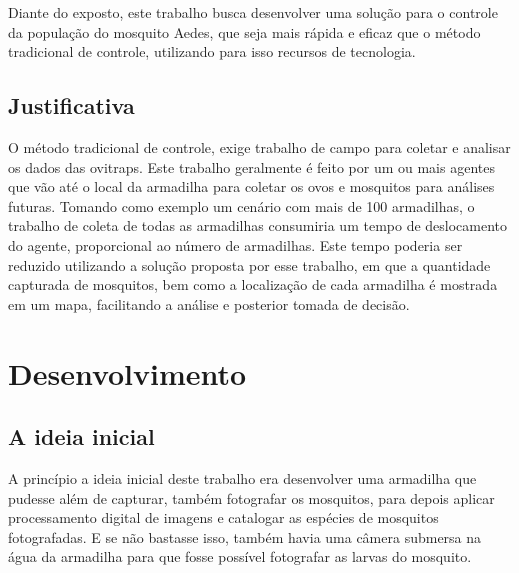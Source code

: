 \documentclass[
	12pt,				%
	openright,			%
	oneside,			%
	a4paper,			%
	chapter=TITLE,		%
	english,			%
	brazil				%
	]{abntex2}
\begin{document}
Diante do exposto, este trabalho busca desenvolver uma solução para o controle da
população do mosquito Aedes, que seja mais rápida e eficaz que o método tradicional de
controle, utilizando para isso recursos de tecnologia.

\section{Justificativa}

O método tradicional de controle, exige trabalho de campo para coletar e analisar os dados
das ovitraps. Este trabalho geralmente é feito por um ou mais agentes que vão até o local
da armadilha para coletar os ovos e mosquitos para análises futuras. Tomando como
exemplo um cenário com mais de 100 armadilhas, o trabalho de coleta de todas as
armadilhas consumiria um tempo de deslocamento do agente, proporcional ao número de
armadilhas. Este tempo poderia ser reduzido utilizando a solução proposta por esse trabalho, em que a quantidade capturada de mosquitos,
bem como a localização de cada armadilha é mostrada em um mapa, facilitando a análise e posterior tomada de decisão.

\chapter{Desenvolvimento}

\section{A ideia inicial}

A princípio a ideia inicial deste trabalho era desenvolver uma armadilha que pudesse além de capturar, também fotografar os mosquitos, para depois aplicar processamento digital de 
imagens e catalogar as espécies de mosquitos fotografadas. E se não bastasse isso, também havia uma câmera submersa na água da armadilha para que fosse possível 
fotografar as larvas do mosquito.
\end{document}
